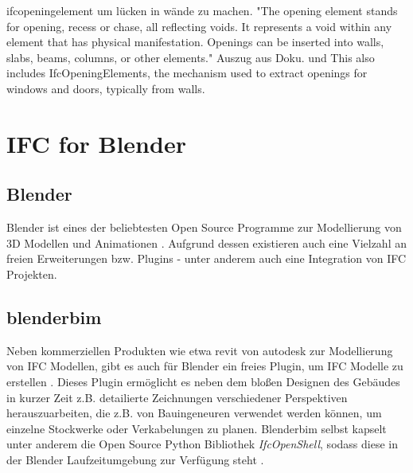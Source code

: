 ifcopeningelement um lücken in wände zu machen.
"The opening element stands for opening, recess or chase, all reflecting voids. It represents a void within any element that has physical manifestation. Openings can be inserted into walls, slabs, beams, columns, or other elements." Auszug aus Doku. und This also includes IfcOpeningElements, the mechanism used to extract openings for windows and doors, typically from walls. %

\section{IFC for Blender}\label{basics:blender}
\subsection{Blender}
Blender ist eines der beliebtesten Open Source Programme zur Modellierung von 3D Modellen und Animationen \cite{blendero56:online}.
Aufgrund dessen existieren auch eine Vielzahl an freien Erweiterungen bzw. Plugins - unter anderem auch eine Integration von IFC Projekten.

\subsection{blenderbim}
Neben kommerziellen Produkten wie etwa revit von autodesk \cite{RevitSof26:online} zur Modellierung von IFC Modellen, gibt es auch für Blender ein freies Plugin, um IFC Modelle zu erstellen \cite{BlenderB43:online}.
Dieses Plugin ermöglicht es neben dem bloßen Designen des Gebäudes in kurzer Zeit z.B. detailierte Zeichnungen verschiedener Perspektiven herauszuarbeiten, die z.B. von Bauingeneuren verwendet werden können, um einzelne Stockwerke oder Verkabelungen zu planen.
Blenderbim selbst kapselt unter anderem die Open Source Python Bibliothek \textit{IfcOpenShell}, sodass diese in der Blender Laufzeitumgebung zur Verfügung steht \cite{IFCOpenShell:online}.

